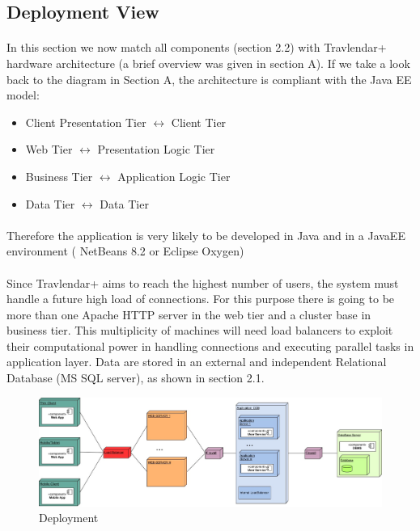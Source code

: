 \documentclass{article}
\begin{document}
		\subsection{Deployment View}
			\paragraph{}In this section we now match all components (section 2.2) with Travlendar+ hardware architecture (a brief overview was given in section A). If we take a look back to the diagram in Section A, the architecture is compliant with the Java EE model:
			\begin{itemize}
			\item{} Client Presentation Tier $\longleftrightarrow$ Client Tier
			\item{} Web Tier $\longleftrightarrow$ Presentation Logic Tier
			\item{} Business Tier $\longleftrightarrow$ Application Logic Tier
			\item{} Data Tier $\longleftrightarrow$ Data Tier
			\end{itemize}
			\paragraph{}Therefore the application is very likely to be developed in Java and in a JavaEE environment ( NetBeans 8.2 or Eclipse Oxygen)
			\paragraph{}Since Travlendar+ aims to reach the highest number of users, the system must handle a future high load of connections. For this purpose there is going to be more than one Apache HTTP  server in the web tier and a cluster base in business tier. This multiplicity of machines will need load balancers  to exploit their computational power in handling connections and executing parallel tasks in application layer. Data are stored in an external and independent Relational Database (MS SQL server), as shown in section 2.1. 
				\begin{figure}[H]
				\includegraphics[width=\linewidth]{Images/Architecture/Deployment3.jpg}
				\caption{Deployment}
				\label{fig:D}
				\end{figure}
\end{document}
